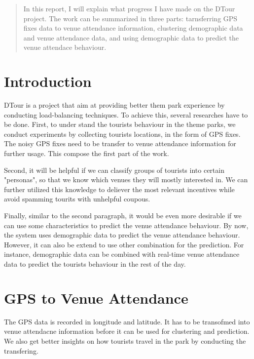 \documentclass[12pt]{article}
\begin{document}
\maketitle

\begin{abstract}
In this report, I will explain what progress I have made on the DTour project. The work can be summarized in three parts: tarnsferring GPS fixes data to venue attendance information, clustering demographic data and venue attendance data, and using demographic data to predict the venue attendace behaviour.
\end{abstract}

\section{Introduction}
DTour is a project that aim at providing better them park experience by conducting load-balancing techniques. To achieve this, several researches have to be done. First, to under stand the tourists behaviour in the theme parks, we conduct experiments by collecting tourists locations, in the form of GPS fixes. The noisy GPS fixes need to be transfer to venue attendance information for further usage. This compose the first part of the work.

Second, it will be helpful if we can classify groups of tourists into certain "personas", so that we know which venues they will mostly interested in. We can further utilized this knowledge to deliever the most relevant incentives while avoid spamming tourits with unhelpful coupous.

Finally, similar to the second paragraph, it would be even more desirable if we can use some characteristics to predict the venue attendance behaviour. By now, the system uses demographic data to predict the venue attendance behaviour. However, it can also be extend to use other combination for the prediction. For instance, demographic data can be combined with real-time venue attendance data to predict the tourists behaviour in the rest of the day.

\section{GPS to Venue Attendance}\label{gps_venue}
The GPS data is recorded in longitude and latitude. It has to be transofmed into venue attendacne information before it can be used for clustering and prediction. We also get better insights on how tourists travel in the park by conducting the transfering.
\end{document}
